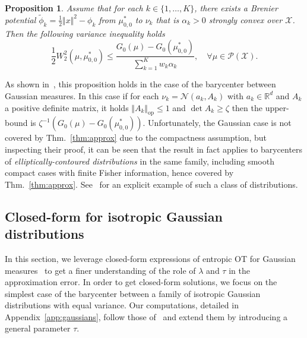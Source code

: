 \documentclass[11pt]{article}
\newcommand{\RR}{\mathbb{R}}
\newcommand{\Nn}{\mathcal{N}}
\newcommand{\Pp}{\mathcal{P}}
\newcommand{\Xx}{\mathcal{X}}
\newtheorem{proposition}[theorem]{Proposition}
\begin{document}
\begin{proposition}
Assume that for each $k\in \{1,\dots,K\}$, there exists a Brenier potential $\tilde \phi_k = \frac12\Vert x\Vert^2 - \phi_k$ from $\mu_{0,0}^*$ to $\nu_k$ that is $\alpha_k>0$ strongly convex over $\Xx$. Then the following \emph{variance inequality} holds
$$
\frac12 W_2^2(\mu,\mu^*_{0,0}) \leq \frac{G_0(\mu) - G_0(\mu^*_{0,0})}{\sum_{k=1}^K w_k \alpha_k}, \quad \forall \mu \in \Pp(\Xx).
$$
\end{proposition}
As shown in~\cite{chewi2020gradient}, this proposition holds in the case of the barycenter between Gaussian measures. In this case if for each $\nu_k=\Nn(a_k,A_k)$ with $a_k\in \RR^d$ and $A_k$ a positive definite matrix, it holds $\Vert A_k\Vert_{\mathrm{op}}\leq 1$ and $\det A_k\geq \zeta$ then the upper-bound is $\zeta^{-1}(G_0(\mu)-G_0(\mu^*_{0,0}))$. Unfortunately, the Gaussian case is not covered by Thm.~\ref{thm:approx} due to the compactness assumption, but inspecting their proof, it can be seen that the result in fact applies to barycenters of \emph{elliptically-contoured distributions} in the same family, including smooth compact cases with finite Fisher information, hence covered by Thm.~\ref{thm:approx}. See~\cite[Prop.~14]{chizat2020faster} for an explicit example of such a class of distributions.


\subsection{Closed-form for isotropic Gaussian distributions}\label{sec:gaussians}
In this section, we leverage closed-form expressions of entropic OT for Gaussian measures~\cite{chen2016relation, mallasto2022entropy, del2020statistical,janati2020entropic} to get a finer understanding of the role of $\lambda$ and $\tau$ in the approximation error. In order to get closed-form solutions, we focus on the simplest case of the barycenter between a family of isotropic Gaussian distributions with equal variance. Our computations, detailed in Appendix~\ref{app:gaussians}, follow those of~\cite{janati2020debiased}  and extend them by introducing a general parameter $\tau$.
\end{document}
